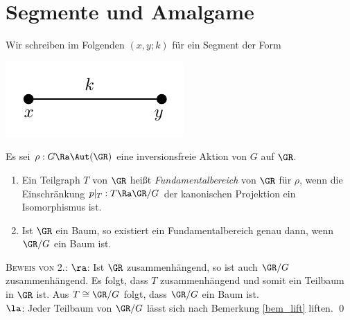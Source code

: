 \section{Segmente und Amalgame}\label{sec_seg}

Wir schreiben im Folgenden $(x,y;k)$ für ein Segment
der Form
\begin{center}
	\includegraphics{grugraImages/segment}
\end{center}

\DB Es sei $\rho:G\Ra\Aut(\GR)$ eine inversionsfreie Aktion von $G$
auf $\GR$.
\begin{enumerate}
\item Ein Teilgraph $T$ von $\GR$ heißt \emph{Fundamentalbereich}
von $\GR$ für $\rho$, wenn die Einschränkung
$p|_T : T \Ra \GR/G$
der kanonischen Projektion ein Isomorphismus ist.
\item Ist $\GR$ ein Baum, so existiert ein Fundamentalbereich genau
dann, wenn $\GR/G$ ein Baum ist.
\end{enumerate}
\textsc{Beweis von 2.:} \glqq$\ra$\grqq: Ist $\GR$ zusammenhängend,
so ist auch $\GR/G$ zusammenhängend. Es folgt, dass $T$ 
zusammenhängend und somit ein Teilbaum in $\GR$ ist.
Aus $T\cong \GR/G$ folgt, dass $\GR/G$ ein Baum ist.\\
\glqq$\la$\grqq: Jeder Teilbaum von $\GR/G$ lässt sich nach
Bemerkung \ref{bem_lift} liften.
\qed

